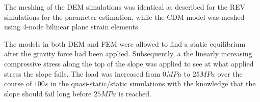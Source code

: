The meshing of the DEM simulations was identical as described for the REV simulations for the parameter estimation, while the CDM model was meshed using 4-node bilinear plane strain elements.

The models in both DEM and FEM were allowed to find a static equilibrium after the gravity force had been applied. Subsequently, a the linearly increasing compressive stress along the top of the slope was applied to see at what applied stress the slope fails. The load was increased from $0MPa$ to $25 MPa$ over the course of $100s$ in the quasi-static/static simulations with the knowledge that the slope should fail long before $25MPa$ is reached.